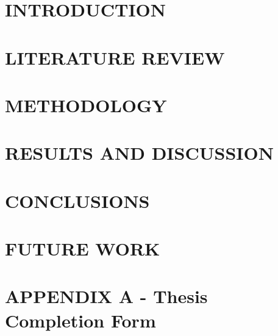 \documentclass[12pt,twoside]{article}
\begin{document}
\cleardoublepage

\renewcommand{\contentsname}{TABLE OF CONTENTS}
\tableofcontents
\pagebreak
\listoffigures
\listoftables
\cleardoublepage
{}

\section{INTRODUCTION}

\cleardoublepage

\section{LITERATURE REVIEW}

\cleardoublepage

\section{METHODOLOGY}

\cleardoublepage

\section{RESULTS AND DISCUSSION}

\cleardoublepage

\section{CONCLUSIONS}
\cleardoublepage

\section{FUTURE WORK}

\cleardoublepage

\printbibliography[title={REFERENCES},heading=bibnumbered]
\cleardoublepage

\appendix
\section*{APPENDIX A - Thesis Completion Form}
\cleardoublepage

\end{document}
